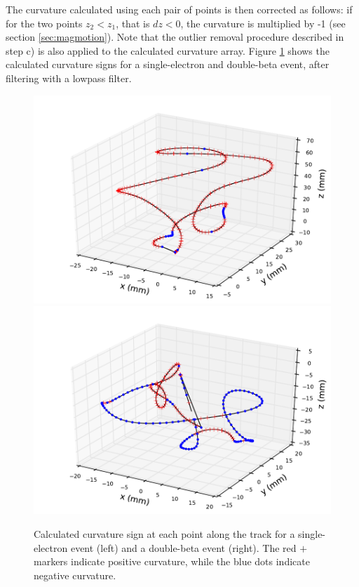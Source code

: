 \documentclass{JINST}
\begin{document}
The curvature calculated using each pair of points is then corrected as follows: if for the two points $z_2 < z_1$, that is $dz < 0$, the curvature is multiplied by -1 (see section \ref{sec:magmotion}).  Note that the outlier removal procedure described in step c) is also applied to the calculated curvature array.  Figure \ref{fig_trkcurv} shows the calculated curvature signs for a single-electron and double-beta event, after filtering with a lowpass filter.

\begin{figure}[!htb]
	\includegraphics[scale=0.48]{fig/plt_trkcurv_nmagse2_6.pdf}
	\includegraphics[scale=0.48]{fig/plt_trkcurv_nmagbb2_2.pdf}
	\caption{\label{fig_trkcurv}Calculated curvature sign at each point along the track for a single-electron event (left) and a double-beta event (right).  The red $+$ markers indicate positive curvature, while the blue dots indicate negative curvature.}
\end{figure}
\end{document}
